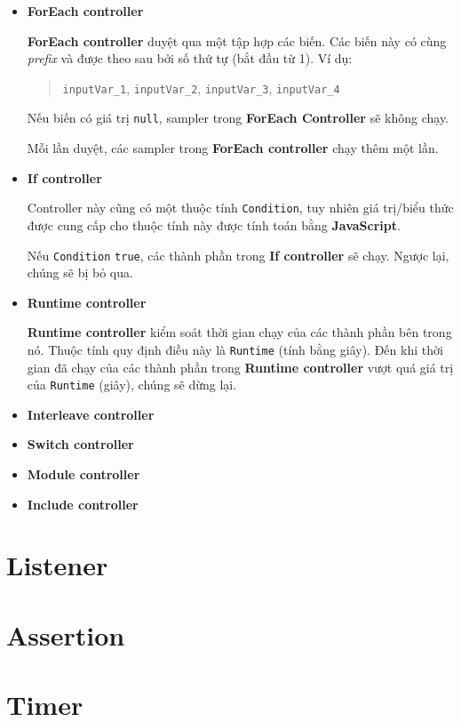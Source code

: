 \documentclass[10pt]{report}
\begin{document}
\begin{itemize}[itemsep=0pt]
    \item \textbf{ForEach controller}
        \par \textbf{ForEach controller} duyệt qua một tập hợp các biến. Các biến này có cùng \textit{prefix} và được theo sau bởi số thứ tự (bắt đầu từ 1). Ví dụ:
        \begin{quotation}
            \texttt{inputVar\_1}, \texttt{inputVar\_2}, \texttt{inputVar\_3}, \texttt{inputVar\_4}
        \end{quotation}
        \par Nếu biến có giá trị \texttt{null}, sampler trong \textbf{ForEach Controller} sẽ không chạy.
        \par Mỗi lần duyệt, các sampler trong \textbf{ForEach controller} chạy thêm một lần.
    \item \textbf{If controller}
        \par Controller này cũng có một thuộc tính \texttt{Condition}, tuy nhiên giá trị/biểu thức được cung cấp cho thuộc tính này được tính toán bằng \textbf{JavaScript}.
        \par Nếu \texttt{Condition} \texttt{true}, các thành phần trong \textbf{If controller} sẽ chạy. Ngược lại, chúng sẽ bị bỏ qua.
    \item \textbf{Runtime controller}
        \par \textbf{Runtime controller} kiểm soát thời gian chạy của các thành phần bên trong nó. Thuộc tính quy định điều này là \texttt{Runtime} (tính bằng giây). Đến khi thời gian đã chạy của các thành phần trong \textbf{Runtime controller} vượt quá giá trị của \texttt{Runtime} (giây), chúng sẽ dừng lại.
    \item \textbf{Interleave controller}
    \item \textbf{Switch controller}
    \item \textbf{Module controller}
    \item \textbf{Include controller}
\end{itemize}

\section{Listener}

\section{Assertion}

\section{Timer}
\end{document}

